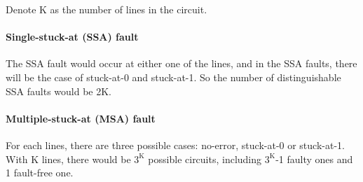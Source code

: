 Denote K as the number of lines in the circuit.

\paragraph{Single-stuck-at (SSA) fault}
The SSA fault would occur at either one of the lines, and in the SSA faults, there will be the case of stuck-at-0 and stuck-at-1. So the number of distinguishable SSA faults would be 2K.
\paragraph{Multiple-stuck-at (MSA) fault}
For each lines, there are three possible cases: no-error, stuck-at-0 or stuck-at-1. With K lines, there would be $\text{3}^\text{K}$ possible circuits, including $\text{3}^\text{K}$-1 faulty ones and 1 fault-free one.
